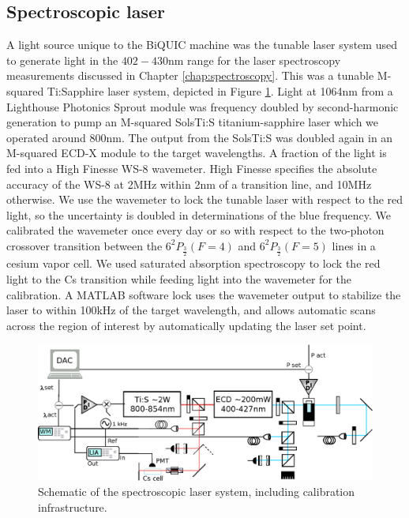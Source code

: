 \subsection*{Spectroscopic laser}
	A light source unique to the BiQUIC machine was the tunable laser system used to generate light in the $402-430$nm range for the laser spectroscopy measurements discussed  in Chapter \ref{chap:spectroscopy}.
	This  was a tunable M-squared Ti:Sapphire laser system, depicted in Figure \ref{fig:tunable_laser}.
	Light at 1064nm from a Lighthouse Photonics Sprout module was frequency doubled by second-harmonic generation to pump an M-squared SolsTi:S titanium-sapphire laser which we operated around 800nm.
	The output from the SolsTi:S was doubled again in an M-squared ECD-X module to the target wavelengths.
	A fraction of the light is fed into a High Finesse WS-8 wavemeter.
	High Finesse specifies the absolute accuracy of the WS-8 at 2MHz within 2nm of a transition line, and 10MHz otherwise.
	We use the wavemeter to lock the tunable laser with respect to the red light, so the uncertainty is doubled in determinations of the blue frequency.
	We calibrated the wavemeter once every day or so with respect to the two-photon crossover transition between the $6^2P_{\frac{3}{2}} (F=4)$ and $6^2P_{\frac{3}{2}} (F=5)$ lines in a cesium vapor cell.
	We used saturated absorption spectroscopy to lock the red light to the Cs transition while feeding light into the wavemeter for the calibration.	A MATLAB software lock uses the wavemeter output to stabilize the laser to within 100kHz of the target wavelength, and allows automatic scans across the region of interest by automatically updating the laser set point.

	\begin{figure}
		\centering
		\includegraphics[width=\textwidth]{fig/apparatus/solstis_schematic_minim}
		\caption{Schematic of the spectroscopic laser system, including calibration infrastructure.
	}
		\label{fig:tunable_laser}
	\end{figure}
	
